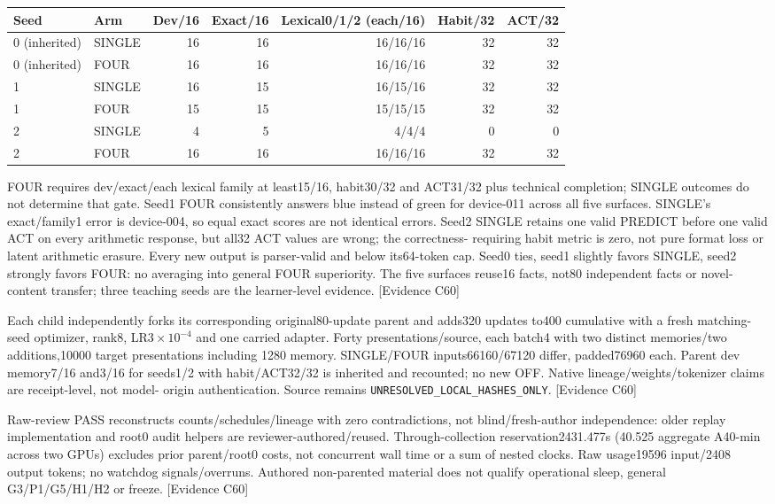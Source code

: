 \documentclass[11pt]{article}
\newcommand{\ev}[1]{\textsf{[Evidence #1]}}
\begin{document}
\begin{center}
\begin{tabular}{llrrrrr}
\toprule
Seed & Arm & Dev/16 & Exact/16 & Lexical0/1/2 (each/16) & Habit/32 & ACT/32 \\
\midrule
0 (inherited) & SINGLE & 16 & 16 & 16/16/16 & 32 & 32 \\
0 (inherited) & FOUR & 16 & 16 & 16/16/16 & 32 & 32 \\
1 & SINGLE & 16 & 15 & 16/15/16 & 32 & 32 \\
1 & FOUR & 15 & 15 & 15/15/15 & 32 & 32 \\
2 & SINGLE & 4 & 5 & 4/4/4 & 0 & 0 \\
2 & FOUR & 16 & 16 & 16/16/16 & 32 & 32 \\
\bottomrule
\end{tabular}
\end{center}

FOUR requires dev/exact/each lexical family at least15/16, habit30/32 and
ACT31/32 plus technical completion; SINGLE outcomes do not determine that gate.
Seed1 FOUR consistently answers blue instead of green for device-011 across all
five surfaces. SINGLE's exact/family1 error is device-004, so equal exact scores
are not identical errors. Seed2 SINGLE retains one valid PREDICT before one valid
ACT on every arithmetic response, but all32 ACT values are wrong; the correctness-
requiring habit metric is zero, not pure format loss or latent arithmetic erasure.
Every new output is parser-valid and below its64-token cap. Seed0 ties, seed1
slightly favors SINGLE, seed2 strongly favors FOUR: no averaging into general
FOUR superiority. The five surfaces reuse16 facts, not80 independent facts or
novel-content transfer; three teaching seeds are the learner-level evidence.
\ev{C60}

Each child independently forks its corresponding original80-update parent and
adds320 updates to400 cumulative with a fresh matching-seed optimizer, rank8,
LR$3\times10^{-4}$ and one carried adapter. Forty presentations/source, each batch4
with two distinct memories/two additions,10000 target presentations including
1280 memory. SINGLE/FOUR inputs66160/67120 differ, padded76960 each. Parent dev
memory7/16 and3/16 for seeds1/2 with habit/ACT32/32 is inherited and recounted;
no new OFF. Native lineage/weights/tokenizer claims are receipt-level, not model-
origin authentication. Source remains \texttt{UNRESOLVED\_LOCAL\_HASHES\_ONLY}.
\ev{C60}

Raw-review PASS reconstructs counts/schedules/lineage with zero contradictions,
not blind/fresh-author independence: older replay implementation and root0 audit
helpers are reviewer-authored/reused. Through-collection reservation2431.477s
(40.525 aggregate A40-min across two GPUs) excludes prior parent/root0 costs,
not concurrent wall time or a sum of nested clocks. Raw usage19596 input/2408
output tokens; no watchdog signals/overruns. Authored non-parented material does
not qualify operational sleep, general G3/P1/G5/H1/H2 or freeze. \ev{C60}
\end{document}
